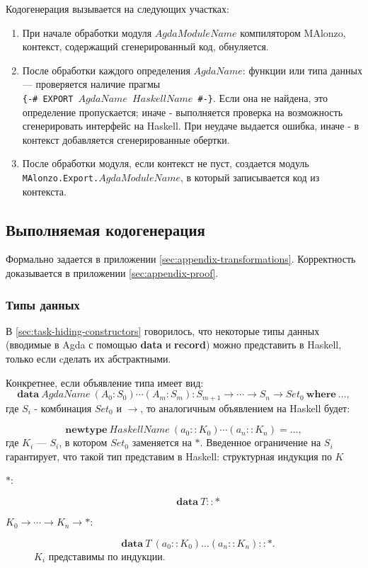 Кодогенерация вызывается на следующих участках:
\begin{enumerate}
\item При начале обработки модуля \(AgdaModuleName\) компилятором MAlonzo,
      контекст, содержащий сгенерированный код, обнуляется.
\item После обработки каждого определения \(AgdaName\): функции или типа данных ---
      проверяется наличие прагмы \\\texttt{\{-\# EXPORT \(AgdaName\) \(HaskellName\) \#-\}}.
      Если она не найдена, это определение пропускается; иначе - выполняется проверка
      на возможность сгенерировать интерфейс на Haskell. При неудаче выдается ошибка,
      иначе - в контекст добавляется сгенерированные обертки.
\item После обработки модуля, если контекст не пуст, создается модуль\\
      \texttt{MAlonzo.Export.\(AgdaModuleName\)}, в который записывается код из контекста.
\end{enumerate}

\subsection{Выполняемая кодогенерация}

Формально задается в приложении \ref{sec:appendix-transformations}.
Корректность доказывается в приложении \ref{sec:appendix-proof}.

\subsubsection{Типы данных}\label{sec:implementation-datatypes}

В \ref{sec:task-hiding-constructors} говорилось, что некоторые типы данных
(вводимые в Agda с помощью \textbf{data} и \textbf{record}) можно
представить в Haskell, только если cделать их абстрактными.

Конкретнее, если объявление типа имеет вид:
\[
\mathbf{data}\ AgdaName\ (A_0 : S_0) \cdots (A_m : S_m) :
S_{m+1} \rightarrow \cdots \rightarrow S_n \rightarrow Set_0\ \mathbf{where}\ \dots,
\]
где \(S_i\) - комбинация \(Set_0\)
и \(\rightarrow\), то аналогичным объявлением на Haskell будет:

\[
\mathbf{newtype}\ HaskellName\ (a_0 :: K_0) \cdots (a_n :: K_n) = \dots,
\]
где \(K_i\) --- \(S_i\), в котором \(Set_0\) заменяется на \(*\).
Введенное ограничение на \(S_i\) гарантирует, что такой тип представим
в Haskell: структурная индукция по \(K\)
\begin{description}
\item[\(*\): ]
\[
\mathbf{data}\ T :: *
\]
\item[\(K_0 \rightarrow \cdots \rightarrow K_n \rightarrow *\): ]
\[
\mathbf{data}\ T\ (a_0 :: K_0) \ldots (a_n :: K_n) :: *.
\]
\(K_i\) представимы по индукции.
\end{description}

